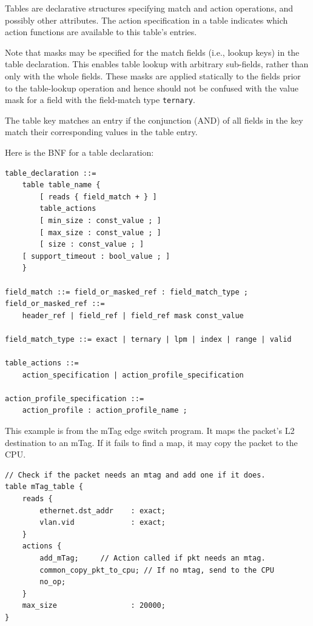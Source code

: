 \documentclass[12pt]{article}
\begin{document}
Tables are declarative structures specifying match and action operations, and
possibly other attributes. The action specification in a table indicates which
action functions are available to this table's entries.

Note that masks may be specified for the match fields (i.e., lookup keys) in the 
table declaration. This enables table lookup with arbitrary sub-fields, rather 
than only with the whole fields. These masks are applied statically to the fields
prior to the table-lookup operation and hence should not be confused with 
the value mask for a field with the field-match type \texttt{ternary}.

The table key matches an entry if the conjunction (AND) of all fields in
the key match their corresponding values in the table entry.

Here is the BNF for a table declaration:

\begin{lstlisting}[style=BNFstyle]
table_declaration ::=
    table table_name {
        [ reads { field_match + } ]
        table_actions
        [ min_size : const_value ; ]
        [ max_size : const_value ; ]
        [ size : const_value ; ]
	[ support_timeout : bool_value ; ]
    }

field_match ::= field_or_masked_ref : field_match_type ;
field_or_masked_ref ::= 
    header_ref | field_ref | field_ref mask const_value

field_match_type ::= exact | ternary | lpm | index | range | valid

table_actions ::= 
    action_specification | action_profile_specification

action_profile_specification ::= 
    action_profile : action_profile_name ;
\end{lstlisting}

This example is from the mTag edge switch program.  It maps the packet's 
L2 destination to an mTag. If it fails to find a map, it may copy the packet 
to the CPU.

\begin{lstlisting}[style=P4style]
// Check if the packet needs an mtag and add one if it does.
table mTag_table {
    reads {
        ethernet.dst_addr    : exact;
        vlan.vid             : exact;
    }
    actions {
        add_mTag;     // Action called if pkt needs an mtag.
        common_copy_pkt_to_cpu; // If no mtag, send to the CPU
        no_op;
    }
    max_size                 : 20000;
}
\end{lstlisting}
\end{document}
